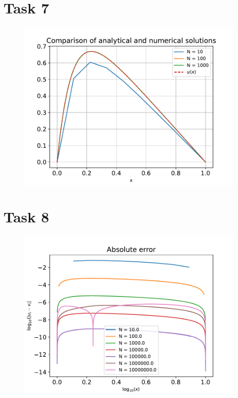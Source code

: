 \documentclass[english,notitlepage]{revtex4-1}  %
\begin{document}
\section*{Task 7}
    \begin{figure}[!ht]
        \centering
        \includegraphics[scale=0.7]{comparison.pdf}
        \caption{}
        \label{comparison_plot}
    \end{figure}
        
    
\section*{Task 8}
    \begin{figure}[!ht]
        \centering
        \includegraphics[scale=0.7]{abs_error.pdf}
        \caption{}
        \label{abs_error}
    \end{figure}
\end{document}
